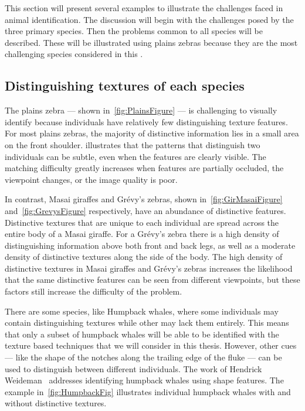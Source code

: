     This section will present several examples to illustrate the challenges faced in animal identification. The
    discussion will begin with the challenges posed by the three primary species. Then the problems common to all
    species will be described. These will be illustrated using plains zebras because they are the most challenging
    species considered in this \thesis{}.

    \subsection{Distinguishing textures of each species}
        The plains zebra --- shown in~\cref{fig:PlainsFigure} --- is challenging to visually identify because
        individuals have relatively few distinguishing texture features. For most plains zebras, the majority of distinctive
        information lies in a small area on the front shoulder.  illustrates that the patterns
        that distinguish two individuals can be subtle, even when the features are clearly visible. The matching
        difficulty greatly increases when features are partially occluded, the viewpoint changes, or the image quality
        is poor.

        In contrast, Masai giraffes and Grévy's zebras, shown in~\cref{fig:GirMasaiFigure}
        and~\cref{fig:GrevysFigure} respectively, have an abundance of distinctive features. Distinctive textures
        that are unique to each individual are spread across the entire body of a Masai giraffe. For a Grévy's
        zebra there is a high density of distinguishing information above both front and back legs, as well as a
        moderate density of distinctive textures along the side of the body. The high density of distinctive
        textures in Masai giraffes and Grévy's zebras increases the likelihood that the same distinctive features
        can be seen from different viewpoints, but these factors still increase the difficulty of the problem.

        There are some species, like Humpback whales, where some individuals may contain distinguishing textures
          while other may lack them entirely.
        This means that only a subset of humpback whales will be able to be identified with the texture based
          techniques that we will consider in this thesis.
        However, other cues --- like the shape of the notches along the trailing edge of the fluke --- can be
          used to distinguish between different individuals.
        The work of Hendrick Weideman~\cite{hendrick} addresses identifying humpback whales using shape features.
        The example in~\cref{fig:HumpbackFig} illustrates individual humpback whales with and without distinctive
          textures.

